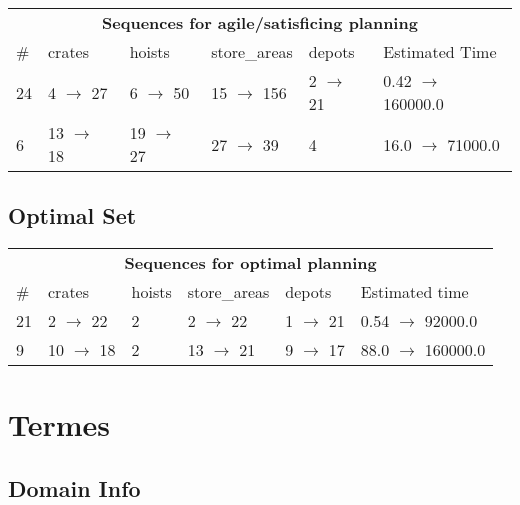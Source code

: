 \documentclass{article}
\begin{document}
                        \begin{center}
                        \begin{tabular}{l|l|l|l|l|l}
                        \multicolumn{6}{c}{\bf \large Sequences for agile/satisficing planning}\\
                        \# & crates & hoists & store\_areas & depots & Estimated Time\\\midrule
                        24&4 $\rightarrow$ 27&6 $\rightarrow$ 50&15 $\rightarrow$ 156&2 $\rightarrow$ 21&0.42 $\rightarrow$ 160000.0\\
6&13 $\rightarrow$ 18&19 $\rightarrow$ 27&27 $\rightarrow$ 39&4&16.0 $\rightarrow$ 71000.0
                        \end{tabular}
                        \end{center}
                    
                            \subsection*{Optimal Set}

                            \begin{center}
                            \begin{tabular}{l|l|l|l|l|l}
                            \multicolumn{6}{c}{\bf \large Sequences for optimal planning}\\
                            \# & crates & hoists & store\_areas & depots & Estimated time\\\midrule
                            21&2 $\rightarrow$ 22&2&2 $\rightarrow$ 22&1 $\rightarrow$ 21&0.54 $\rightarrow$ 92000.0\\
9&10 $\rightarrow$ 18&2&13 $\rightarrow$ 21&9 $\rightarrow$ 17&88.0 $\rightarrow$ 160000.0
                            \end{tabular}
                            \end{center}
                    \newpage \section{Termes}
                    \subsection*{Domain Info}
\end{document}
